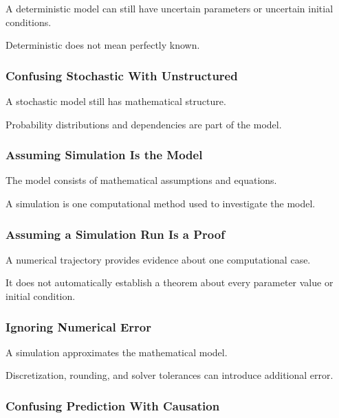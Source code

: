 A deterministic model can still have uncertain parameters or uncertain
initial conditions.

Deterministic does not mean perfectly known.

\subsubsection{Confusing Stochastic With Unstructured}

A stochastic model still has mathematical structure.

Probability distributions and dependencies are part of the model.

\subsubsection{Assuming Simulation Is the Model}

The model consists of mathematical assumptions and equations.

A simulation is one computational method used to investigate the model.

\subsubsection{Assuming a Simulation Run Is a Proof}

A numerical trajectory provides evidence about one computational case.

It does not automatically establish a theorem about every parameter value or
initial condition.

\subsubsection{Ignoring Numerical Error}

A simulation approximates the mathematical model.

Discretization, rounding, and solver tolerances can introduce additional
error.

\subsubsection{Confusing Prediction With Causation}

